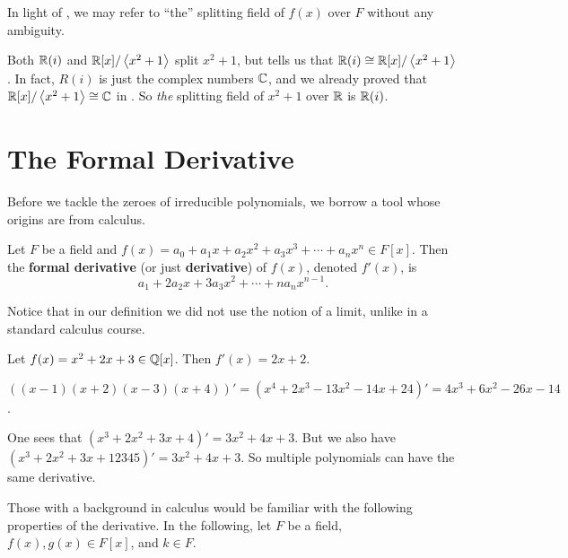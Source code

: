 In light of , we may refer to ``the'' splitting field of $f(x)$ over $F$ without any ambiguity.

\begin{example}
    Both $\mathbb{R}(i)$ and $\mathbb{R}[x]/\left\langle x^2+1\right\rangle$ split $x^2+1$, but  tells us that $\mathbb{R}(i) \cong \mathbb{R}[x]/\left\langle x^2+1\right\rangle$. In fact, $R(i)$ is just the complex numbers $\mathbb{C}$, and we already proved that $\mathbb{R}[x]/\left\langle x^2+1\right\rangle \cong \mathbb{C}$ in . So \textit{the} splitting field of $x^2+1$ over $\mathbb{R}$ is $\mathbb{R}(i)$.
\end{example}

\section{The Formal Derivative}
Before we tackle the zeroes of irreducible polynomials, we borrow a tool whose origins are from calculus.

\begin{definition}
    Let $F$ be a field and $f(x) = a_0 + a_1x + a_2x^2 + a_3x^3 + \cdots + a_nx^n \in F[x]$. Then the \textbf{formal derivative} (or just \textbf{derivative}) of $f(x)$, denoted $f'(x)$, is
    \[
        a_1 + 2a_2x + 3a_3x^2 + \cdots + na_nx^{n-1}.
    \]
\end{definition}

Notice that in our definition we did not use the notion of a limit, unlike in a standard calculus course.

\begin{example}
    Let $f(x) = x^2 + 2x + 3 \in \mathbb{Q}[x]$. Then $f'(x) = 2x + 2$.
\end{example}

\begin{example}
    $\left((x-1)(x+2)(x-3)(x+4)\right)' = (x^4 + 2x^3 - 13x^2 - 14x + 24)' = 4x^3 + 6x^2 - 26x - 14$.
\end{example}

\begin{example}
    One sees that $(x^3 + 2x^2 + 3x + 4)' = 3x^2 + 4x + 3$. But we also have $(x^3 + 2x^2 + 3x + 12345)' = 3x^2 + 4x + 3$. So multiple polynomials can have the same derivative.
\end{example}

Those with a background in calculus would be familiar with the following properties of the derivative. In the following, let $F$ be a field, $f(x), g(x) \in F[x]$, and $k \in F$.

